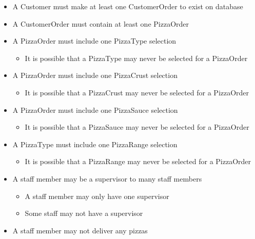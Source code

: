 \begin{itemize}
\item A Customer must make at least one CustomerOrder to exist on database
\item A CustomerOrder must contain at least one PizzaOrder
\item A PizzaOrder must include one PizzaType selection
	\begin{itemize}
	\item It is possible that a PizzaType may never be selected for a PizzaOrder
	\end{itemize}
\item A PizzaOrder must include one PizzaCrust selection
	\begin{itemize}
	\item It is possible that a PizzaCrust may never be selected for a PizzaOrder
	\end{itemize}
\item A PizzaOrder must include one PizzaSauce selection
	\begin{itemize}
	\item It is possible that a PizzaSauce may never be selected for a PizzaOrder
	\end{itemize}
\item A PizzaType must include one PizzaRange selection
	\begin{itemize}
	\item It is possible that a PizzaRange may never be selected for a PizzaOrder
	\end{itemize}
\item A staff member may be a supervisor to many staff members
	\begin{itemize}
	\item A staff member may only have one supervisor
	\item Some staff may not have a supervisor
	\end{itemize}
\item A staff member may not deliver any pizzas
\end{itemize}
